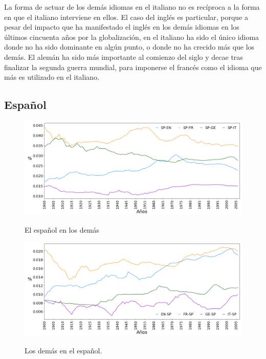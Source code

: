 La forma de actuar de los demás idiomas en el italiano no es recíproca a la forma en que el italiano interviene en ellos.  El caso del inglés es particular, porque a pesar del impacto que ha manifestado el inglés en los demás idiomas  en los últimos cincuenta años por la globalización,  en el italiano ha sido el único idioma donde no ha sido dominante en algún punto, o donde no ha crecido más que los demás.  El alemán ha sido más importante al comienzo del siglo y decae tras finalizar la segunda guerra mundial, para imponerse el francés como el idioma que más es utilizado en el italiano. 


\clearpage
\subsection{Español}

\begin{figure}[h!]
	\centering
	\includegraphics[scale=.36]{Cap_4/PF1_S2_SP.png}
	\label{fig.ST_a_SP}
	\caption{El español en los demás}
\end{figure}
		
\begin{figure}[h!]
	\centering
	\includegraphics[scale=.36]{Cap_4/PF2_S2_SP.png}
	\label{fig.ST_b_SP}
	\caption{Los demás en el español.}
\end{figure}

\clearpage

